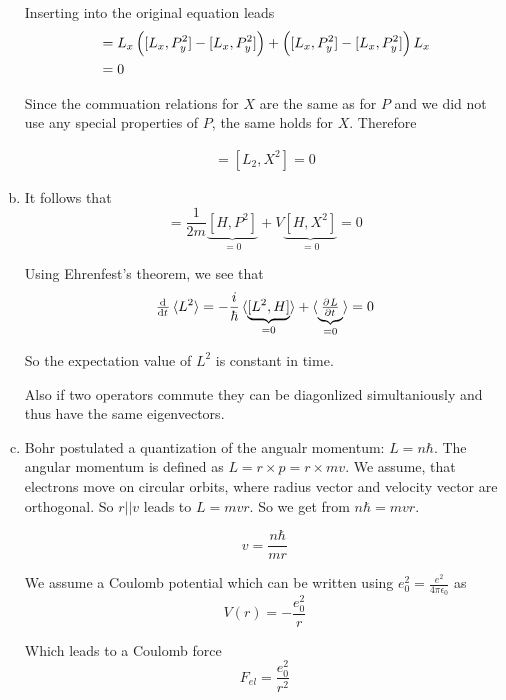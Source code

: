 \documentclass[a4paper,german,12pt,smallheadings]{scrartcl}
\begin{document}
\begin{enumerate}[a)]
    Inserting into the original equation leads
    \begin{align*}
      [L_x, P^2] &= L_x\del{[L_x ,P_y^2] - [L_x, P_y^2]} + \del{[L_x ,P_y^2] - [L_x, P_y^2]}L_x \\
                 &= 0
    \end{align*}

    Since the commuation relations for $X$ are the same as for $P$ and we did
    not use any special properties of $P$, the same holds for $X$. Therefore

    \begin{align*}
      [L^2, P^2] = [L_2, X^2] = 0
    \end{align*}


  \item
    It follows that
    \begin{equation*}
    [H, L^2] = \frac{1}{2m} \underbrace{[H, P^2]}_{=0} + V \underbrace{[H, X^2]}_{=0} = 0
    \end{equation*}

    Using Ehrenfest's theorem, we see that
    \begin{equation*}
      \od{}{t} \braket{L^2} = -\frac{i}{\hbar} \braket{\underbrace{[L^2, H]}_{=0}} + \braket{\underbrace{\pd{L}{t}}_{=0}} = 0
    \end{equation*}

    So the expectation value of $L^2$ is constant in time.

    Also if two operators commute they can be diagonlized simultaniously and
    thus have the same eigenvectors.
  \item
    Bohr postulated a quantization of the angualr momentum: $L = n \hbar$. The
    angular momentum is defined as $L = r \times p = r \times mv$. We assume,
    that electrons move on circular orbits, where radius vector and velocity
    vector are orthogonal. So $r || v$ leads to $L = mvr$. So we get from $n
    \hbar = mvr$.

    \begin{equation*}
      v = \frac{n \hbar}{mr}
    \end{equation*}

    We assume a Coulomb potential which can be written using $e_0^2 =
    \frac{e^2}{4 \pi \epsilon_0}$ as
    \begin{equation*}
      V(r) = - \frac{e_0^2}{r}
    \end{equation*}

    Which leads to a Coulomb force
    \begin{equation*}
      F_{el} = \frac{e_0^2}{r^2}
    \end{equation*}


\end{enumerate}
\end{document}
